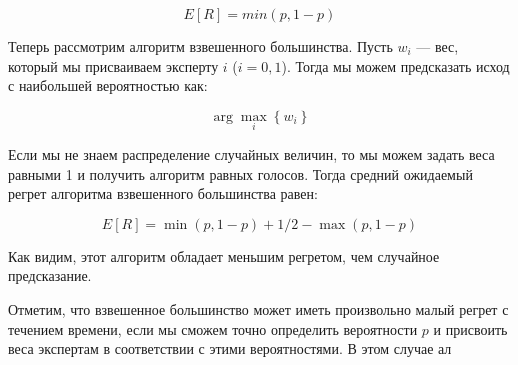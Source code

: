 \documentclass[a4paper,14pt]{extarticle}
\begin{document}
$$ E[R] = min\left(p, 1 - p\right)$$

Теперь рассмотрим алгоритм взвешенного большинства. Пусть $w_i$ — вес, который мы присваиваем эксперту $i$ ($i = 0, 1$). Тогда мы можем предсказать исход с наибольшей вероятностью как:

$$
\arg \max _i\left\{w_i\right\}
$$

Если мы не знаем распределение случайных величин, то мы можем задать веса равными 1 и получить алгоритм равных голосов. Тогда средний ожидаемый регрет алгоритма взвешенного большинства равен:

$$
E[R]=\min (p, 1-p)+1 / 2-\max (p, 1-p)
$$

Как видим, этот алгоритм обладает меньшим регретом, чем случайное предсказание.

Отметим, что взвешенное большинство может иметь произвольно малый регрет с течением времени, если мы сможем точно определить вероятности $p$ и присвоить веса экспертам в соответствии с этими вероятностями. В этом случае ал
\end{document}

